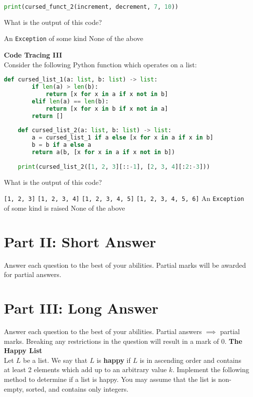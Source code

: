 \documentclass[letterpaper,12pt,addpoints]{exam}
\begin{document}
\begin{questions}
\begin{lstlisting}[language=Python, style=mystyle]
    print(cursed_funct_2(increment, decrement, 7, 10))
    \end{lstlisting}
    What is the output of this code? 
    \begin{choices}
        \choice An \texttt{Exception} of some kind
        \choice None of the above
    \end{choices}

    \question[2] \textbf{Code Tracing III} \\
    Consider the following Python function which operates on a list:
    \begin{lstlisting}[language=Python, style=mystyle]
    def cursed_list_1(a: list, b: list) -> list:
        if len(a) > len(b):
            return [x for x in a if x not in b]
        elif len(a) == len(b):
            return [x for x in b if x not in a]
        return []
    
    def cursed_list_2(a: list, b: list) -> list:
        a = cursed_list_1 if a else [x for x in a if x in b]
        b = b if a else a
        return a(b, [x for x in a if x not in b])
    
    print(cursed_list_2([1, 2, 3][::-1], [2, 3, 4][:2:-3]))
    \end{lstlisting}
    What is the output of this code?
    \begin{choices}
        \choice \texttt{[1, 2, 3]}
        \choice \texttt{[1, 2, 3, 4]}
        \choice \texttt{[1, 2, 3, 4, 5]}
        \choice \texttt{[1, 2, 3, 4, 5, 6]}
        \choice An \texttt{Exception} of some kind is raised
        \choice None of the above
    \end{choices}

    \setcounter{question}{0}
    \clearpage
    \section*{Part II: Short Answer}
    Answer each question to the best of your abilities. Partial marks will be awarded for partial answers. 

    \question[5] 

    \clearpage
    \section*{Part III: Long Answer}
    \setcounter{question}{0}
    Answer each question to the best of your abilities. Partial answers $\implies$ partial marks. Breaking any restrictions in the question will result in a mark of 0.
    \question[10] \textbf{The Happy List} \\
    Let $L$ be a list. We say that $L$ is \textbf{happy} if $L$ is in ascending order and contains at least 2 elements which add up to an arbitrary value $k$. Implement the following method to determine if a list is happy. You may assume that the list is non-empty, sorted, and contains only integers.


\end{questions}
\end{document}
